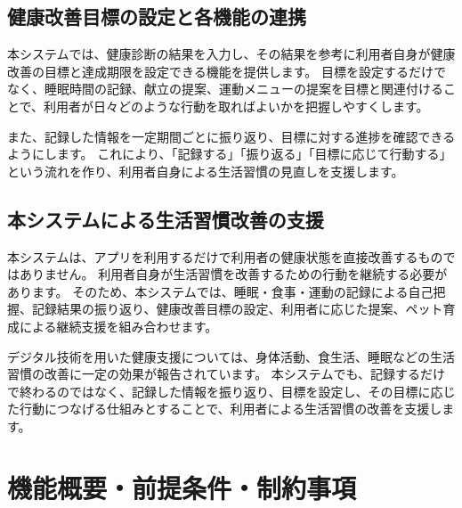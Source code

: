 \documentclass[uplatex,dvipdfmx]{jlreq}
\begin{document}
\subsection{健康改善目標の設定と各機能の連携}
本システムでは、健康診断の結果を入力し、その結果を参考に利用者自身が健康改善の目標と達成期限を設定できる機能を提供します。
目標を設定するだけでなく、睡眠時間の記録、献立の提案、運動メニューの提案を目標と関連付けることで、利用者が日々どのような行動を取ればよいかを把握しやすくします。

また、記録した情報を一定期間ごとに振り返り、目標に対する進捗を確認できるようにします。
これにより、「記録する」「振り返る」「目標に応じて行動する」という流れを作り、利用者自身による生活習慣の見直しを支援します。


\subsection{本システムによる生活習慣改善の支援}
本システムは、アプリを利用するだけで利用者の健康状態を直接改善するものではありません。
利用者自身が生活習慣を改善するための行動を継続する必要があります。
そのため、本システムでは、睡眠・食事・運動の記録による自己把握、記録結果の振り返り、健康改善目標の設定、利用者に応じた提案、ペット育成による継続支援を組み合わせます。

デジタル技術を用いた健康支援については、身体活動、食生活、睡眠などの生活習慣の改善に一定の効果が報告されています。\cite{bib:digital}
本システムでも、記録するだけで終わるのではなく、記録した情報を振り返り、目標を設定し、その目標に応じた行動につなげる仕組みとすることで、利用者による生活習慣の改善を支援します。




\section{機能概要・前提条件・制約事項}
\end{document}
